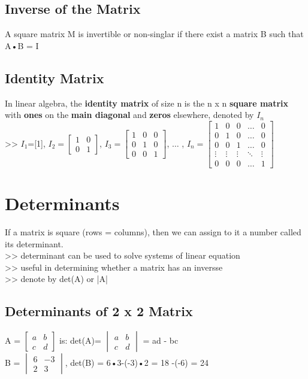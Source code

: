 \documentclass{article}
\begin{document}
\subsection{Inverse of the Matrix}
A square matrix M is invertible or non-singlar if there exist a matrix B such that A•B = I

\subsection{Identity Matrix}
In linear algebra, the \textbf{identity matrix} of size n is the n x n \textbf{square matrix} with \textbf{ones} on the \textbf{main diagonal} and \textbf{zeros} elsewhere, denoted by $I_n$ \\
\indent >> $I_1$=[1], $I_2=\begin{bmatrix} 1 & 0 \\ 0 & 1 \end{bmatrix}$, $I_3=\begin{bmatrix} 1 & 0 & 0 \\ 0 & 1 & 0 \\ 0 & 0 & 1 \end{bmatrix}$, $\hdots$ ,
$I_n=\begin{bmatrix} 1 & 0 & 0 & \hdots & 0 \\ 0 & 1 & 0 & \hdots & 0 \\ 0 & 0 & 1 & \hdots & 0 \\ \vdots & \vdots & \vdots & \ddots & \vdots \\ 0 & 0 & 0 & \hdots & 1 \end{bmatrix}$

\section{Determinants}

If a matrix is square (rows = columns), then we can assign to it a number called its determinant. \\ 
\indent >> determinant can be used to solve systems of linear equation \\
\indent >> useful in determining whether a matrix has an inversse \\ 
\indent >> denote by det(A) or |A|

\subsection{Determinants of 2 x 2 Matrix}
A = $\begin{bmatrix} a & b \\ c & d \end{bmatrix}$ is: det(A)= $\begin{vmatrix} a & b \\ c & d \end{vmatrix}$ = ad - bc \\ 
B = $\begin{vmatrix} 6 & -3 \\ 2 & 3 \end{vmatrix}$, det(B) = 6•3-(-3)•2 = 18 -(-6) = 24
\end{document}
